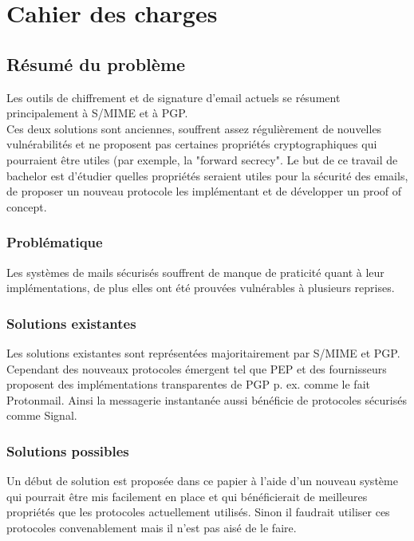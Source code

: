 \chapter{Cahier des charges}


\section*{Résumé du problème}
Les outils de chiffrement et de signature d'email actuels se résument principalement à S/MIME et à PGP. \\
Ces deux solutions sont anciennes, souffrent assez régulièrement de nouvelles vulnérabilités et ne proposent pas certaines propriétés cryptographiques qui pourraient être utiles (par exemple, la "forward secrecy". Le but de ce travail de bachelor est d'étudier quelles propriétés seraient utiles pour la sécurité des emails, de proposer un nouveau protocole les implémentant et de développer un proof of concept. 
\subsection*{Problématique}
Les systèmes de mails sécurisés souffrent de manque de praticité quant à leur implémentations, de plus elles ont été prouvées vulnérables à plusieurs reprises.
\subsection*{Solutions existantes}
Les solutions existantes sont représentées majoritairement par S/MIME et PGP. Cependant des nouveaux protocoles émergent tel que PEP et des fournisseurs proposent des implémentations transparentes de PGP p. ex. comme le fait Protonmail. Ainsi la messagerie instantanée aussi bénéficie de protocoles sécurisés comme Signal.
\subsection*{Solutions possibles}
Un début de solution est proposée dans ce papier à l'aide d'un nouveau système qui pourrait être mis facilement en place et qui bénéficierait de meilleures propriétés que les protocoles actuellement utilisés. Sinon il faudrait utiliser ces protocoles convenablement mais il n'est pas aisé de le faire.
